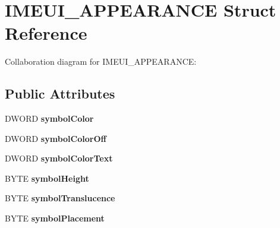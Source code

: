 \hypertarget{struct_i_m_e_u_i___a_p_p_e_a_r_a_n_c_e}{\section{I\+M\+E\+U\+I\+\_\+\+A\+P\+P\+E\+A\+R\+A\+N\+C\+E Struct Reference}
\label{struct_i_m_e_u_i___a_p_p_e_a_r_a_n_c_e}
}


Collaboration diagram for I\+M\+E\+U\+I\+\_\+\+A\+P\+P\+E\+A\+R\+A\+N\+C\+E\+:
\subsection*{Public Attributes}
\begin{DoxyCompactItemize}
\item 
\hypertarget{struct_i_m_e_u_i___a_p_p_e_a_r_a_n_c_e_a675113dfdfebf07e21c3808d51ce63e1}{D\+W\+O\+R\+D {\bfseries symbol\+Color}}\label{struct_i_m_e_u_i___a_p_p_e_a_r_a_n_c_e_a675113dfdfebf07e21c3808d51ce63e1}

\item 
\hypertarget{struct_i_m_e_u_i___a_p_p_e_a_r_a_n_c_e_a4256d4929bb7ec05a4618a709f78ec9a}{D\+W\+O\+R\+D {\bfseries symbol\+Color\+Off}}\label{struct_i_m_e_u_i___a_p_p_e_a_r_a_n_c_e_a4256d4929bb7ec05a4618a709f78ec9a}

\item 
\hypertarget{struct_i_m_e_u_i___a_p_p_e_a_r_a_n_c_e_aca125c1fbd48ee013c32382d198ae9da}{D\+W\+O\+R\+D {\bfseries symbol\+Color\+Text}}\label{struct_i_m_e_u_i___a_p_p_e_a_r_a_n_c_e_aca125c1fbd48ee013c32382d198ae9da}

\item 
\hypertarget{struct_i_m_e_u_i___a_p_p_e_a_r_a_n_c_e_a330d419400ec252dad9fc62d86808a44}{B\+Y\+T\+E {\bfseries symbol\+Height}}\label{struct_i_m_e_u_i___a_p_p_e_a_r_a_n_c_e_a330d419400ec252dad9fc62d86808a44}

\item 
\hypertarget{struct_i_m_e_u_i___a_p_p_e_a_r_a_n_c_e_a47e7b5d4f642795d41ddb1c618542c91}{B\+Y\+T\+E {\bfseries symbol\+Translucence}}\label{struct_i_m_e_u_i___a_p_p_e_a_r_a_n_c_e_a47e7b5d4f642795d41ddb1c618542c91}

\item 
\hypertarget{struct_i_m_e_u_i___a_p_p_e_a_r_a_n_c_e_aa48cd92b10f67866dd361df1711eb8fc}{B\+Y\+T\+E {\bfseries symbol\+Placement}}\label{struct_i_m_e_u_i___a_p_p_e_a_r_a_n_c_e_aa48cd92b10f67866dd361df1711eb8fc}


\end{DoxyCompactItemize}

